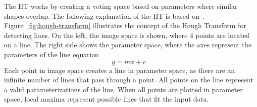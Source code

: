 The HT works by creating a voting space based on parameters where similar shapes overlap\cite{kaiser_survey_2019}.
The following explanation of the HT is based on~\cite{shree_k_nayar_first_2021}.
Figure~\ref{fig:hough-transform} illustrates the concept of the Hough Transform for detecting lines.
On the left, the image space is shown, where 4 points are located on a line.
The right side shows the parameter space, where the axes represent the parameters of the line equation
\begin{equation}
    y = mx + c
\end{equation}
Each point in image space creates a line in parameter space, as there are an infinite number of lines that pass through a point.
All points on the line represent a valid parameterizations of the line.
When all points are plotted in parameter space, local maxima represent possible lines that fit the input data.
